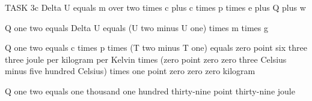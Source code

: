 TASK 3c  
Delta U equals m over two times c plus c times p times e plus Q plus w  

Q one two equals Delta U equals (U two minus U one) times m times g  

Q one two equals c times p times (T two minus T one) equals zero point six three three joule per kilogram per Kelvin times (zero point zero zero three Celsius minus five hundred Celsius) times one point zero zero zero kilogram  

Q one two equals one thousand one hundred thirty-nine point thirty-nine joule